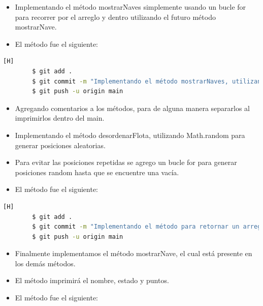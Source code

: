 \documentclass{article}
\begin{document}

    \begin{itemize}	
        \item Implementando el método mostrarNaves simplemente usando un bucle for para recorrer por el arreglo y dentro utilizando el futuro método mostrarNave.
	\item El método fue el siguiente:
    \end{itemize}
    

    \begin{lstlisting}[language=bash,caption={Commit: Implementando el método mostrarNaves, utilizando el futuro método mostrarNave}][H]
		$ git add .
		$ git commit -m "Implementando el método mostrarNaves, utilizando el futuro metodo mostrarNave"
		$ git push -u origin main
    \end{lstlisting}


    \begin{itemize}	
        \item Agregando comentarios a los métodos, para de alguna manera separarlos al imprimirlos dentro del main.
        \item Implementando el método desordenarFlota, utilizando Math.random para generar posiciones aleatorias.
        \item Para evitar las posiciones repetidas se agrego un bucle for para generar posiciones random hasta que se encuentre una vacía.
	\item El método fue el siguiente:
    \end{itemize}
    

    \begin{lstlisting}[language=bash,caption={Commit: Implementando el método para retornar un arreglo aleatoriamente desordenado}][H]
		$ git add .
		$ git commit -m "Implementando el método para retornar un arreglo aleatoriamente desordenado"
		$ git push -u origin main
    \end{lstlisting}


    \begin{itemize}	
        \item Finalmente implementamos el método mostrarNave, el cual está presente en los demás métodos.
        \item El método imprimirá el nombre, estado y puntos.
	\item El método fue el siguiente:
    \end{itemize}
    
\end{document}
